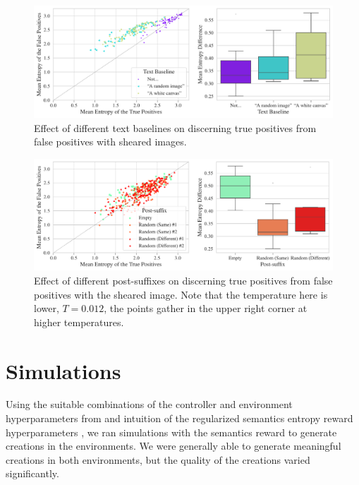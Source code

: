\begin{figure}[H]
    \centering
    \includegraphics[width=\textwidth]{images/baseline_sheared_adversarial_2.pdf}
    \caption{Effect of different text baselines on discerning true positives from false positives with sheared images.}
    \label{fig:baseline_sheared_adversarial}
\end{figure}

\begin{figure}[H]
    \centering
    \includegraphics[width=\textwidth]{images/post-suffix_sheared_adversarial_12.pdf}
    \caption[Effect of different post-suffixes on discerning true positives from false positives with the sheared image.]{Effect of different post-suffixes on discerning true positives from false positives with the sheared image. Note that the temperature here is lower, \(T = 0.012\), the points gather in the upper right corner at higher temperatures.}
    \label{fig:post-suffix_sheared_adversarial}
\end{figure}


\section{Simulations}
\label{sec:simulations}

Using the suitable combinations of the controller and environment hyperparameters from  and intuition of the regularized semantics entropy reward hyperparameters , we ran simulations with the semantics reward to generate creations in the environments.
We were generally able to generate meaningful creations in both environments, but the quality of the creations varied significantly.


